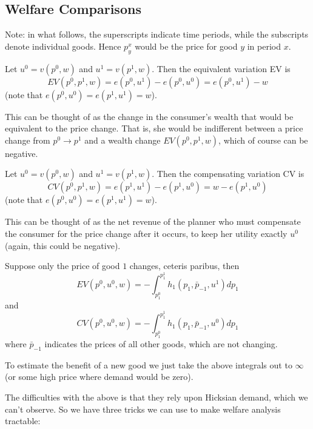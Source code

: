 

\subsection{Welfare Comparisons}
\label{sec:welfare-comparisons}

Note: in what follows, the superscripts indicate time periods, while
the subscripts denote individual goods. Hence $p^x_y$ would be the
price for good $y$ in period $x$.

\begin{definition}
  Let $u^0 = v(p^0, w)$ and $u^1 = v(p^1, w)$. Then the equivalent
  variation EV is
  \[
  EV(p^0, p^1, w) = e(p^0, u^1) - e(p^0, u^0) = e(p^0, u^1) - w
  \]
  (note that $e(p^0, u^0) = e(p^1, u^1) = w$). 

  This can be thought of as the change in the consumer's wealth that
  would be equivalent to the price change. That is, she would be
  indifferent between a price change from $p^0 \to p^1$ and a wealth
  change $EV(p^0, p^1, w)$, which of course can be negative.
\end{definition}

\begin{definition}
  Let $u^0 = v(p^0, w)$ and $u^1 = v(p^1, w)$. Then the compensating
  variation CV is
  \[
  CV(p^0, p^1, w) = e(p^1, u^1) - e(p^1, u^0) = w - e(p^1, u^0)
  \]
  (note that $e(p^0, u^0) = e(p^1, u^1) = w$). 

  This can be thought of as the net revenue of the planner who must
  compensate the consumer for the price change after it occurs, to
  keep her utility exactly $u^0$ (again, this could be negative).
\end{definition}

\begin{theorem}
  Suppose only the price of good $1$ changes, ceteris paribus, then
  \[
  EV(p^0, u^0, w) 
  = -\int_{p_1^0}^{p_1^1} h_1(p_1, \bar p_{-1}, u^1) dp_1
  \]
  and
  \[
  CV(p^0, u^0, w) 
  = -\int_{p_1^0}^{p_1^1} h_1(p_1, \bar p_{-1}, u^0) dp_1
  \]
  where $\bar p_{-1}$ indicates the prices of all other goods, which
  are not changing.
  
\end{theorem}

To estimate the benefit of a new good we just take the above integrals
out to $\infty$ (or some high price where demand would be zero).

The difficulties with the above is that they rely upon Hicksian
demand, which we can't observe. So we have three tricks we can use to
make welfare analysis tractable:


